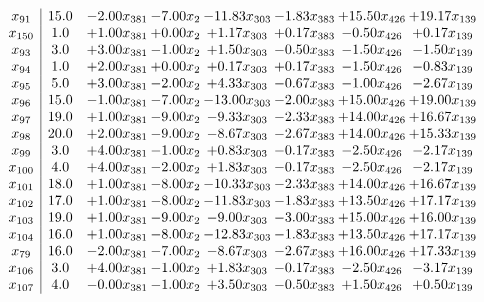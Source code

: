 \documentclass[8pt]{article}
\begin{document}
\[\begin{array}{c| c c@{\hskip 2pt} c@{\hskip 2pt} c@{\hskip 2pt} c@{\hskip 2pt} c@{\hskip 2pt} c@{\hskip 2pt} }
 x_{91}   &  15.0 & -2.00 x_{381} & -7.00 x_{2} & -11.83 x_{303} & -1.83 x_{383} & + 15.50 x_{426} & + 19.17 x_{139}\\
 x_{150}   &  1.0 & +  1.00 x_{381} & +  0.00 x_{2} & +  1.17 x_{303} & +  0.17 x_{383} & -0.50 x_{426} & +  0.17 x_{139}\\
 x_{93}   &  3.0 & +  3.00 x_{381} & -1.00 x_{2} & +  1.50 x_{303} & -0.50 x_{383} & -1.50 x_{426} & -1.50 x_{139}\\
 x_{94}   &  1.0 & +  2.00 x_{381} & +  0.00 x_{2} & +  0.17 x_{303} & +  0.17 x_{383} & -1.50 x_{426} & -0.83 x_{139}\\
 x_{95}   &  5.0 & +  3.00 x_{381} & -2.00 x_{2} & +  4.33 x_{303} & -0.67 x_{383} & -1.00 x_{426} & -2.67 x_{139}\\
 x_{96}   &  15.0 & -1.00 x_{381} & -7.00 x_{2} & -13.00 x_{303} & -2.00 x_{383} & + 15.00 x_{426} & + 19.00 x_{139}\\
 x_{97}   &  19.0 & +  1.00 x_{381} & -9.00 x_{2} & -9.33 x_{303} & -2.33 x_{383} & + 14.00 x_{426} & + 16.67 x_{139}\\
 x_{98}   &  20.0 & +  2.00 x_{381} & -9.00 x_{2} & -8.67 x_{303} & -2.67 x_{383} & + 14.00 x_{426} & + 15.33 x_{139}\\
 x_{99}   &  3.0 & +  4.00 x_{381} & -1.00 x_{2} & +  0.83 x_{303} & -0.17 x_{383} & -2.50 x_{426} & -2.17 x_{139}\\
 x_{100}   &  4.0 & +  4.00 x_{381} & -2.00 x_{2} & +  1.83 x_{303} & -0.17 x_{383} & -2.50 x_{426} & -2.17 x_{139}\\
 x_{101}   &  18.0 & +  1.00 x_{381} & -8.00 x_{2} & -10.33 x_{303} & -2.33 x_{383} & + 14.00 x_{426} & + 16.67 x_{139}\\
 x_{102}   &  17.0 & +  1.00 x_{381} & -8.00 x_{2} & -11.83 x_{303} & -1.83 x_{383} & + 13.50 x_{426} & + 17.17 x_{139}\\
 x_{103}   &  19.0 & +  1.00 x_{381} & -9.00 x_{2} & -9.00 x_{303} & -3.00 x_{383} & + 15.00 x_{426} & + 16.00 x_{139}\\
 x_{104}   &  16.0 & +  1.00 x_{381} & -8.00 x_{2} & -12.83 x_{303} & -1.83 x_{383} & + 13.50 x_{426} & + 17.17 x_{139}\\
 x_{79}   &  16.0 & -2.00 x_{381} & -7.00 x_{2} & -8.67 x_{303} & -2.67 x_{383} & + 16.00 x_{426} & + 17.33 x_{139}\\
 x_{106}   &  3.0 & +  4.00 x_{381} & -1.00 x_{2} & +  1.83 x_{303} & -0.17 x_{383} & -2.50 x_{426} & -3.17 x_{139}\\
 x_{107}   &  4.0 & -0.00 x_{381} & -1.00 x_{2} & +  3.50 x_{303} & -0.50 x_{383} & +  1.50 x_{426} & +  0.50 x_{139}\\

\end{array}\]
\end{document}
